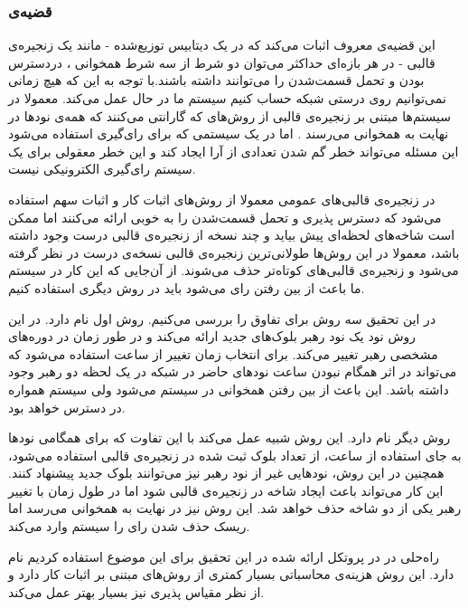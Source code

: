 \subsubsection{قضیه‌ی }
این قضیه‌ی معروف 
\cite{CAP}
اثبات می‌کند که در یک دیتابیس توزیع‌شده - مانند یک زنجیره‌ی قالبی - در هر بازه‌ای حداکثر می‌توان دو شرط از سه شرط همخوانی 
، دردسترس بودن 
و تحمل قسمت‌شدن
را می‌توانند داشته باشند.با توجه به این که هیچ زمانی نمی‌توانیم روی درستی شبکه حساب کنیم سیستم‌ ما در حال  عمل می‌کند. معمولا در سیستم‌ها مبتنی بر زنجیره‌ی قالبی از روش‌های  که گارانتی می‌کنند که همه‌ی نودها در نهایت به همخوانی می‌رسند
.
اما در یک سیستمی که برای رای‌گیری استفاده می‌شود این مسئله می‌تواند خطر گم شدن تعدادی از آرا ایجاد کند و این خطر معقولی برای یک‌ سیستم‌ رای‌گیری الکترونیکی نیست.
\par
در زنجیره‌ی قالبی‌های عمومی معمولا از روش‌های اثبات کار و اثبات‌ سهم استفاده می‌شود که دسترس پذیری و تحمل قسمت‌شدن را به خوبی ارائه می‌کنند اما ممکن است شاخه‌های
لحظه‌ای پیش بیاید و چند نسخه از زنجیره‌ی قالبی درست وجود داشته باشد، معمولا در این روش‌ها طولانی‌ترین زنجیره‌ی قالبی نسخه‌ی درست در نظر گرفته می‌شود و زنجیره‌ی قالبی‌های کوتاه‌تر حذف می‌شوند. از آن‌جایی که این کار در سیستم ما باعث از بین رفتن رای‌ می‌شود باید در روش دیگری استفاده کنیم.
\par
در این تحقیق سه روش برای تفاوق را بررسی می‌کنیم. روش اول 
\cite{Aura}
 نام دارد. در این روش نود یک نود رهبر بلوک‌های جدید ارائه می‌کند و در طور زمان در دوره‌های مشخصی رهبر تغییر می‌کند. برای انتخاب زمان تغییر از ساعت  استفاده می‌شود که می‌تواند در اثر همگام
 نبودن ساعت نود‌های حاضر در شبکه در یک لحظه دو رهبر وجود داشته باشد. این باعث از بین رفتن همخوانی در سیستم می‌شود ولی سیستم همواره در دسترس خواهد بود. 
\par
روش دیگر  
\cite{Clique}
نام دارد. این روش شبیه  عمل می‌کند با این تفاوت که برای همگامی نودها به جای استفاده از ساعت، از تعداد بلوک ثبت شده در زنجیره‌ی قالبی استفاده می‌شود، همچنین در این روش، نود‌هایی غیر از نود رهبر نیز می‌توانند بلوک جدید پیشنهاد کنند. این کار می‌تواند باعث ایجاد شاخه‌ در زنجیره‌ی قالبی شود اما در طول زمان با تغییر رهبر یکی از دو شاخه حذف خواهد شد. این روش نیز در نهایت به همخوانی می‌رسد اما ریسک حذف شدن رای را سیستم وارد می‌کند.
\par

راه‌حلی در در پروتکل ارائه شده در این تحقیق برای این موضوع استفاده کردیم
\cite{PBFT}
نام دارد. این روش هزینه‌ی محاسباتی بسیار کمتری از روش‌های مبتنی بر اثبات کار دارد و از نظر مقیاس پذیری
\cite{PBFperf}
نیز بسیار بهتر عمل می‌کند.

